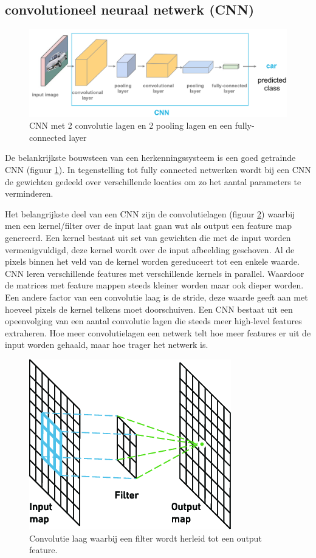 
\subsection{convolutioneel neuraal netwerk (CNN) }
\begin{figure}[!ht]
    \centering
 	\includegraphics[width=0.80\linewidth]{fig/CNN.png}
 	\caption{CNN met 2 convolutie lagen en 2 pooling lagen en een fully-connected layer}
 	\label{fig:cnn}
\end{figure}

De belankrijkste bouwsteen van een herkenningssysteem is een goed getrainde CNN (figuur \ref{fig:cnn}). 
In tegenstelling tot fully connected netwerken wordt bij een CNN de gewichten gedeeld over verschillende locaties om zo het aantal parameters te verminderen.
 
Het belangrijkste deel van een CNN zijn de convolutielagen (figuur \ref{fig:conv_laag}) waarbij men een kernel/filter over de input laat gaan wat als output een feature map genereerd. 
Een kernel bestaat uit set van gewichten die met de input worden vermenigvuldigd, deze kernel wordt over de input afbeelding geschoven. 
Al de pixels binnen het veld van de kernel worden gereduceert tot een enkele waarde. 
CNN leren verschillende features met verschillende kernels in parallel. 
Waardoor de matrices met feature mappen steeds kleiner worden maar ook dieper worden. Een andere factor van een convolutie laag is de stride, deze waarde geeft aan met hoeveel pixels de kernel telkens moet doorschuiven. 
Een CNN bestaat uit een opeenvolging van een aantal convolutie lagen die steeds meer high-level features extraheren. Hoe meer convolutielagen een netwerk telt hoe meer features er uit de input worden gehaald, maar hoe trager het netwerk is. 

\begin{figure}[!ht]
	\centering
	\includegraphics[width=0.35\linewidth]{fig/convolution layer.png}
	\caption{Convolutie laag waarbij een filter wordt herleid tot een output feature.}
	\label{fig:conv_laag}
\end{figure}

